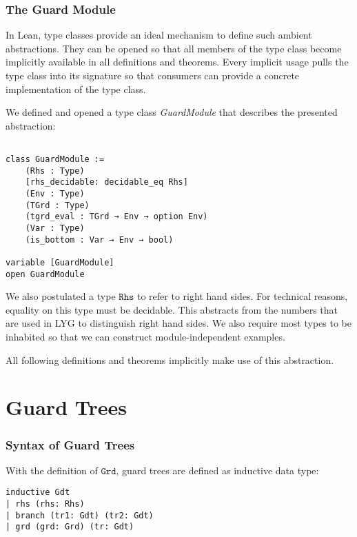 \bigskip

\subsubsection{The Guard Module}

In Lean, type classes provide an ideal mechanism to define such ambient abstractions.
They can be opened so that all members of the type class become implicitly available in all definitions and theorems.
Every implicit usage pulls the type class into its signature so that consumers can provide a concrete implementation of the type class.

We defined and opened a type class \textit{GuardModule} that describes the presented abstraction:

\begin{verbatim}

class GuardModule :=
    (Rhs : Type)
    [rhs_decidable: decidable_eq Rhs]
    (Env : Type)
    (TGrd : Type)
    (tgrd_eval : TGrd → Env → option Env)
    (Var : Type)
    (is_bottom : Var → Env → bool)

variable [GuardModule]
open GuardModule
\end{verbatim}

We also postulated a type $\mathtt{Rhs}$ to refer to right hand sides. For technical reasons, equality on this type must be decidable.
This abstracts from the numbers that are used in LYG to distinguish right hand sides.
We also require most types to be inhabited so that we can construct module-independent examples.

All following definitions and theorems implicitly make use of this abstraction.

\section{Guard Trees}\label{chap:formalGuardTrees}

\subsubsection{Syntax of Guard Trees}

With the definition of $\mathtt{Grd}$, guard trees are defined as inductive data type:

\begin{verbatim}
inductive Gdt
| rhs (rhs: Rhs)
| branch (tr1: Gdt) (tr2: Gdt)
| grd (grd: Grd) (tr: Gdt)
\end{verbatim}

